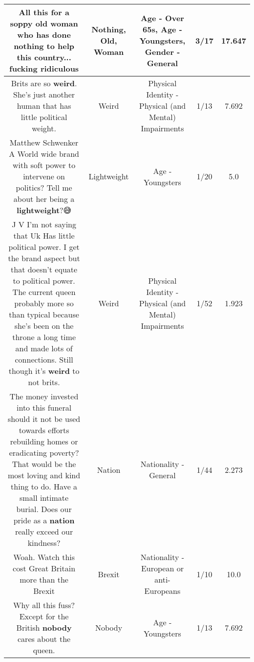 \documentclass[11pt]{article}
\newlength\mylength
\begin{document}
\begin{center}
\begin{longtable}{|C{.65\mylength}|C{.30\mylength}|C{.12\mylength}|C{.12\mylength}|C{.12\mylength}|}
  \small All this for a soppy \textbf{old} \textbf{woman} who has done \textbf{nothing} to help this country... fucking ridiculous\normalsize   & Nothing, Old, Woman & Age - Over 65s, Age - Youngsters, Gender - General & 3/17 & 17.647 \\  \hline
  \small Brits are so \textbf{weird}. She's just another human that has little political weight.\normalsize   & Weird & Physical Identity - Physical (and Mental) Impairments & 1/13 & 7.692 \\  \hline
  \small Matthew Schwenker A World wide brand with soft power to intervene on politics? Tell me about her being a \textbf{lightweight}?😅\normalsize   & Lightweight & Age - Youngsters & 1/20 & 5.0 \\  \hline
  \small J V I'm not saying that Uk Has little political power. I get the brand aspect but that doesn't equate to political power. The current queen probably more so than typical because she's been on the throne a long time and made lots of connections. Still though it's \textbf{weird} to not brits.\normalsize   & Weird & Physical Identity - Physical (and Mental) Impairments & 1/52 & 1.923 \\  \hline
  \small The money invested into this funeral should it not be used towards efforts rebuilding homes or eradicating poverty? That would be the most loving and kind thing to do. Have a small intimate burial. Does our pride as a \textbf{nation} really exceed our kindness?\normalsize   & Nation & Nationality - General & 1/44 & 2.273 \\  \hline
  \small Woah. Watch this cost Great Britain more than the Brexit\normalsize   & Brexit & Nationality - European or anti-Europeans & 1/10 & 10.0 \\  \hline
  \small Why all this fuss? Except for the British \textbf{nobody} cares about the queen.\normalsize   & Nobody & Age - Youngsters & 1/13 & 7.692 \\  \hline

\end{longtable}
\end{center}
\end{document}
